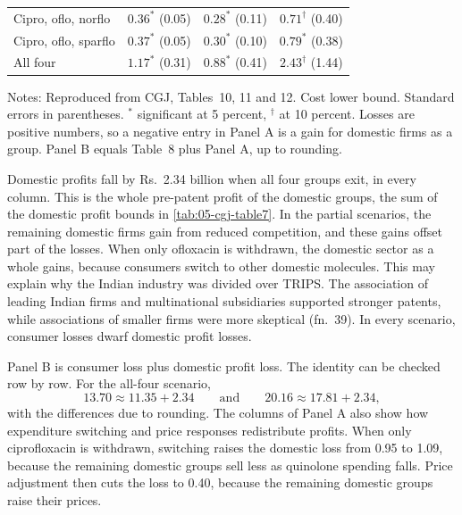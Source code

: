 \begin{table}[htbp]
\begin{tabular}{lccc}
Cipro, oflo, norflo & $0.36^{*}$ (0.05) & $0.28^{*}$ (0.11) & $0.71^{\dagger}$ (0.40) \\
Cipro, oflo, sparflo & $0.37^{*}$ (0.05) & $0.30^{*}$ (0.10) & $0.79^{*}$ (0.38) \\
All four & $1.17^{*}$ (0.31) & $0.88^{*}$ (0.41) & $2.43^{\dagger}$ (1.44) \\
\bottomrule
\end{tabular}
\par\smallskip
\begin{minipage}{0.95\textwidth}\footnotesize
Notes: Reproduced from CGJ, Tables~10, 11 and 12. Cost lower bound. Standard errors in parentheses. $^{*}$
significant at 5 percent, $^{\dagger}$ at 10 percent. Losses are positive numbers, so a negative entry in Panel A is a
gain for domestic firms as a group. Panel B equals Table~8 plus Panel A, up to rounding.
\end{minipage}
\end{table}

Domestic profits fall by Rs.~2.34 billion when all four groups exit, in every column. This is the whole pre-patent
profit of the domestic groups, the sum of the domestic profit bounds in \cref{tab:05-cgj-table7}. In the partial
scenarios, the remaining domestic firms gain from reduced competition, and these gains offset part of the losses.
When only ofloxacin is withdrawn, the domestic sector as a whole gains, because consumers switch to other domestic
molecules. This may explain why the Indian industry was divided over TRIPS. The association of leading Indian firms
and multinational subsidiaries supported stronger patents, while associations of smaller firms were more skeptical
(fn.~39).
In every scenario, consumer losses dwarf domestic profit losses.

Panel B is consumer loss plus domestic profit loss. The identity can be checked row by row. For the all-four scenario,
\begin{equation*}
13.70 \approx 11.35 + 2.34 \qquad\text{and}\qquad 20.16 \approx 17.81 + 2.34,
\end{equation*}
with the differences due to rounding. The columns of Panel A also show how expenditure switching and price responses
redistribute profits. When only ciprofloxacin is withdrawn, switching raises the domestic loss from 0.95 to 1.09,
because the remaining domestic groups sell less as quinolone spending falls. Price adjustment then cuts the loss to
0.40, because the remaining domestic groups raise their prices.

